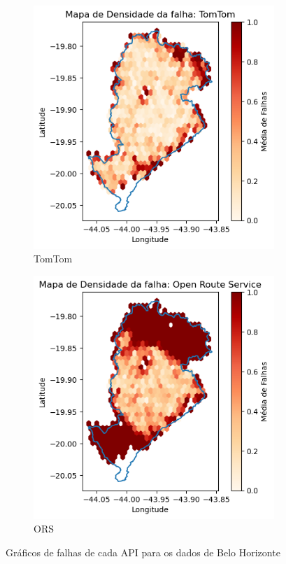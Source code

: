 \begin{figure}[ht]
  \begin{subfigure}[b]{0.45\textwidth}
    \includegraphics[width=\textwidth]{Figuras/falhasTomtomBH.png}
    \caption{TomTom}
    \label{fig:falhastomtomB}
  \end{subfigure}
  \hfill
  \begin{subfigure}[b]{0.45\textwidth}
    \includegraphics[width=\textwidth]{Figuras/falhasORSBH.png}
    \caption{ORS}
    \label{fig:falhasorsB}
  \end{subfigure}
  
  \caption{Gráficos de falhas de cada API para os dados de Belo Horizonte}
  \label{fig:falhas-global-bh}
\end{figure}

